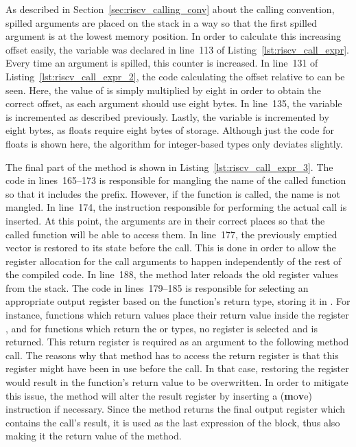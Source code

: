 As described in Section~\ref{sec:riscv_calling_conv} about the \riscv{} calling convention, spilled arguments are placed on the stack in a way so that the first spilled argument is at the lowest memory position.
In order to calculate this increasing offset easily, the  variable was declared in line~113 of Listing~\ref{lst:riscv_call_expr}.
Every time an argument is spilled, this counter is increased.
In line~131 of Listing~\ref{lst:riscv_call_expr_2}, the code calculating the offset relative to  can be seen.
Here, the value of  is simply multiplied by eight in order to obtain the correct offset, as each argument should use eight bytes.
In line~135, the  variable is incremented as described previously.
Lastly, the  variable is incremented by eight bytes, as floats require eight bytes of storage.
Although just the code for floats is shown here, the algorithm for integer-based types only deviates slightly.


The final part of the  method is shown in Listing~\ref{lst:riscv_call_expr_3}.
The code in lines~165--173 is responsible for mangling the name of the called function so that it includes the  prefix.
However, if the  function is called, the name is not mangled.
In line~174, the  instruction responsible for performing the actual call is inserted.
At this point, the arguments are in their correct places so that the called function will be able to access them.
In line~177, the previously emptied  vector is restored to its state before the call.
This is done in order to allow the register allocation for the call arguments to happen independently of the rest of the compiled code.
In line~188, the method  later reloads the old register values from the stack.
The code in lines~179--185 is responsible for selecting an appropriate output register based on the function's return type, storing it in .
For instance, functions which return  values place their return value inside the register , and for functions which return the \qVerb{()} or \qVerb{!} types, no register is selected and  is returned.
This return register is required as an argument to the following  method call.
The reasons why that method has to access the return register is that this register might have been in use before the call.
In that case, restoring the register would result in the function's return value to be overwritten.
In order to mitigate this issue, the method will alter the result register by inserting a  (\textbf{m}o\textbf{v}e) instruction if necessary.
Since the method returns the final output register which contains the call's result, it is used as the last expression of the block, thus also making it the return value of the  method.

